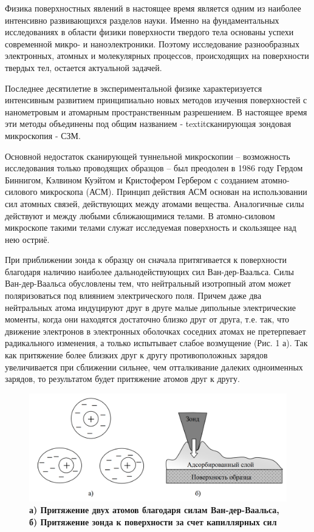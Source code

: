 \documentclass[a4paper]{article}
\begin{document}
Физика поверхностных явлений в настоящее время является одним из наиболее интенсивно развивающихся разделов науки. Именно на фундаментальных исследованиях в области физики поверхности твердого тела основаны успехи современной микро- и наноэлектроники. Поэтому исследование разнообразных электронных, атомных и молекулярных процессов, происходящих на поверхности твердых тел, остается актуальной задачей.

Последнее десятилетие в экспериментальной физике характеризуется интенсивным развитием принципиально новых методов изучения поверхностей с нанометровым и атомарным пространственным разрешением. В настоящее время эти методы объединены под общим названием - textit{сканирующая зондовая микроскопия} - СЗМ.

Основной недостаток сканирующей туннельной микроскопии – возможность исследования только проводящих образцов – был преодолен в 1986 году Гердом Биннигом, Кэлвином Куэйтом и Кристофером Гербером с созданием атомно-силового микроскопа (АСМ). Принцип действия АСМ основан на использовании сил атомных связей, действующих между атомами вещества. Аналогичные силы действуют и между любыми сближающимися телами. В атомно-силовом микроскопе такими телами служат исследуемая поверхность и скользящее над нею остриё. 

При приближении зонда к образцу он сначала притягивается к поверхности благодаря наличию наиболее дальнодействующих сил Ван-дер-Ваальса. Силы Ван-дер-Ваальса обусловлены тем, что нейтральный изотропный атом может поляризоваться под влиянием электрического поля. Причем даже два нейтральных атома индуцируют друг в друге малые дипольные электрические моменты, когда они находятся достаточно близко друг от друга, т.е. так, что движение электронов в электронных оболочках соседних атомах не претерпевает радикального изменения, а только испытывает слабое возмущение (Рис. 1 а). Так как притяжение более близких друг к другу противоположных зарядов увеличивается при сближении сильнее, чем отталкивание далеких одноименных зарядов, то результатом будет притяжение атомов друг к другу.

\begin{figure}[H]
\centering
	\includegraphics[width=0.5\linewidth]{pic1.png}
		\caption{{\bf {а) Притяжение двух атомов благодаря силам Ван-дер-Ваальса, б) Притяжение зонда к поверхности за счет капиллярных сил}}}
   	\label{fig:1}
\end{figure}
\end{document}
